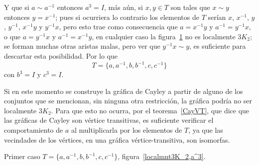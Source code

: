 \documentclass[11pt]{book}
\theoremstyle{definition}
\begin{document}
Y que si $a\sim a^{-1}$ entonces $a^3=I$, m\'as a\'un, si $x,y\in T$
son tales que $x\sim y$ entonces $y=x^{-1}$; pues si ocurriera lo
contrario los elementos de $T$ serían $x$, $x^{-1}$, $y$, $y^{-1}$,
$x^{-1}y$ y $y^{-1}x$, pero esto trae como consecuencia que $a=
x^{-1}y$ y $a^{-1}=y^{-1}x$, o que $a=y^{-1}x$ y $a^{-1}= x^{-1}y$, en
cualquier caso la figura~\ref{b=c,a^3} no es localmente $3K_2$; se
forman muchas otras aristas malas, pero ver que $y^{-1}x \sim y$, es
suficiente para descartar esta posibilidad. Por lo que
$$T=\{a,a^{-1},b,b^{-1},c, c^{-1}\}$$ con $b^3=I$ y $c^{3}=I$.



\begin{figure}
  \centering
  \caption{}\label{b=c,a^3}
\end{figure}

Si en este momento se construye la gráfica de Cayley a partir de
alguno de los conjuntos que se mencionan, sin ninguna otra
restricción, la gráfica podría no ser localmente $3K_2$. Para que esto
no ocurra, por el teorema~\ref{CayVT}, que dice que las gráficas de
Cayley son vértice transitivas, es suficiente verificar el
comportamiento de $a$ al multiplicarla por los elementos de $T$, ya
que las vecindades de los vértices, en una gráfica
vértice-transitiva, son isomorfas.

Primer caso $T=\{a, a^{-1},b,b^{-1},c,c^{-1}\}$,
figura~\ref{localmnt3K_2,a^3}.
\end{document}

